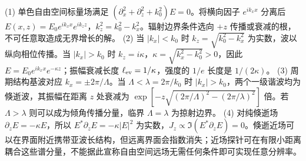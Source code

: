 (1) 单色自由空间标量场满足 \((\partial_x^2+\partial_z^2+k_0^2)E=0\)。将横向因子 \(e^{ik_xx}\) 分离后 \(E(x,z)=E_0e^{ik_xx}e^{ik_zz}\)，\(k_z^2=k_0^2-k_x^2\)。辐射边界条件选向 \(+z\) 传播或衰减的根，不可任意取造成无界增长的解。
(2) 当 \(|k_x|<k_0\) 时 \(k_z=\sqrt{k_0^2-k_x^2}\) 为实数，波以纵向相位传播。当 \(|k_x|>k_0\) 时 \(k_z=i\kappa\)，\(\kappa=\sqrt{k_x^2-k_0^2}>0\)，因此 \(E=E_0e^{ik_xx}e^{-\kappa z}\)；振幅衰减长度 \(\ell_{\rm ev}=1/\kappa\)，强度的 \(1/e\) 长度是 \(1/(2\kappa)\)。
(3) 周期结构基波对应 \(k_x=\pm2\pi/\Lambda\)。当 \(\Lambda<\lambda=2\pi/k_0\) 时 \(|k_x|>k_0\)，两个一级谐波均为倏逝波，其振幅在距离 \(z\) 处衰减为 \(\exp[-z\sqrt{(2\pi/\Lambda)^2-(2\pi/\lambda)^2}]\) 倍。若 \(\Lambda>\lambda\) 则可以成为倾角传播分量，临界 \(\Lambda=\lambda\) 为掠射边界。
(4) 对纯倏逝场 \(\partial_zE=-\kappa E\)，所以 \(E^*\partial_zE=-\kappa|E|^2\) 为实数，\(J_z\propto\Im(E^*\partial_zE)=0\)。倏逝近场可以在界面附近携带亚波长结构，但远离界面会指数消失；近场探针可在有限小距离耦合这些谱分量，不能据此宣称自由空间远场无需任何条件即可实现任意分辨率。
